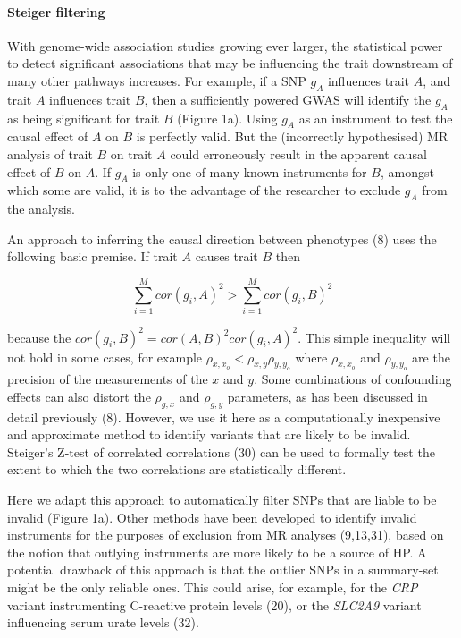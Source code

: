 \documentclass[]{article}
\let\oldparagraph\paragraph
\renewcommand{\paragraph}[1]{\oldparagraph{#1}\mbox{}}
\begin{document}
\paragraph{Steiger filtering}\label{steiger-filtering}

With genome-wide association studies growing ever larger, the
statistical power to detect significant associations that may be
influencing the trait downstream of many other pathways increases. For
example, if a SNP \(g_{A}\) influences trait \(A\), and trait \(A\)
influences trait \(B\), then a sufficiently powered GWAS will identify
the \(g_{A}\) as being significant for trait \(B\) (Figure 1a). Using
\(g_{A}\) as an instrument to test the causal effect of \(A\) on \(B\)
is perfectly valid. But the (incorrectly hypothesised) MR analysis of
trait \(B\) on trait \(A\) could erroneously result in the apparent
causal effect of \(B\) on \(A\). If \(g_{A}\) is only one of many known
instruments for \(B\), amongst which some are valid, it is to the
advantage of the researcher to exclude \(g_{A}\) from the analysis.

An approach to inferring the causal direction between phenotypes (8)
uses the following basic premise. If trait \(A\) causes trait \(B\) then

\[
\sum^M_{i=1}{cor(g_{i}, A)^2} > \sum^M_{i=1}{cor(g_{i}, B)^2}
\]

because the \(cor(g_{i}, B)^2 = cor(A, B)^{2} cor(g_{i}, A)^{2}\). This
simple inequality will not hold in some cases, for example
\(\rho_{x, x_o} < \rho_{x,y}\rho_{y,y_o}\) where \(\rho_{x, x_o}\) and
\(\rho_{y, y_o}\) are the precision of the measurements of the \(x\) and
\(y\). Some combinations of confounding effects can also distort the
\(\rho_{g,x}\) and \(\rho_{g,y}\) parameters, as has been discussed in
detail previously (8). However, we use it here as a computationally
inexpensive and approximate method to identify variants that are likely
to be invalid. Steiger's Z-test of correlated correlations (30) can be
used to formally test the extent to which the two correlations are
statistically different.

Here we adapt this approach to automatically filter SNPs that are liable
to be invalid (Figure 1a). Other methods have been developed to identify
invalid instruments for the purposes of exclusion from MR analyses
(9,13,31), based on the notion that outlying instruments are more likely
to be a source of HP. A potential drawback of this approach is that the
outlier SNPs in a summary-set might be the only reliable ones. This
could arise, for example, for the \emph{CRP} variant instrumenting
C-reactive protein levels (20), or the \emph{SLC2A9} variant influencing
serum urate levels (32).
\end{document}
